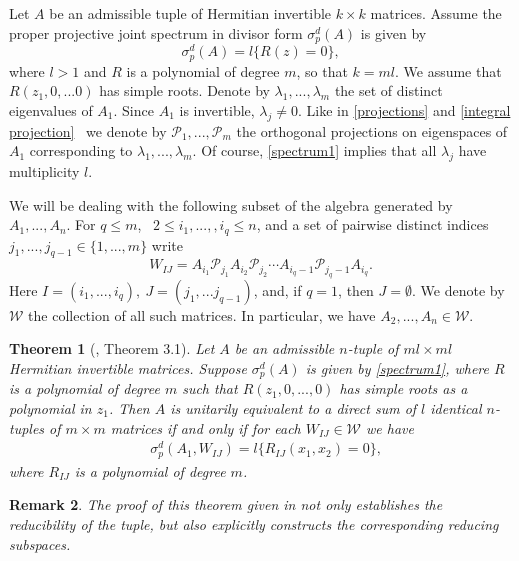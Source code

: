 \documentclass[draft, 12pt, reqno]{amsart}
\numberwithin{equation}{section}
\theoremstyle{plain}
\newtheorem{theorem}{Theorem}[section]
\newtheorem{remark}[theorem]{Remark}
\begin{document}
Let $A$ be an admissible tuple of Hermitian invertible $k\times k$ matrices.
Assume the proper projective joint spectrum in divisor form $\sigma_p^d(A)$ is given by
\begin{equation}\label{spectrum1}
\sigma_p^d(A)=l\Big\{ R(z)=0\Big\}, 
\end{equation}
where $l>1$ and $R$ is a polynomial of degree $m$, so that $k=ml$. We assume that $R(z_1,0,...0)$ has simple roots.
Denote by $\lambda_1,...,\lambda_m$ the set of distinct eigenvalues of $A_1$. Since $A_1$ is invertible, $\lambda_j\neq 0$. Like in \eqref{projections} and \eqref{integral projection}  \  we denote by $\mathcal{P}_1,...,\mathcal{P}_m$ the  orthogonal projections on eigenspaces of $A_1$ corresponding to $\lambda_1,...,\lambda_m$. Of course, \eqref{spectrum1} implies that all $\lambda_j$ have multiplicity $l$.

We will be dealing with the following subset of the algebra generated by $A_1,...,A_n$. 
For $q\leq m$, \  $2\leq i_1,...,,i_q\leq  n$, and a set of pairwise distinct indices $j_1,...,j_{q-1}\in \{1,...,m\}$  write 
\begin{equation}\label{W IJ}
W_{IJ} = A_{i_1}\mathcal{P}_{j_1}A_{i_2}\mathcal{P}_{j_2}\cdots A_{i_q-1}\mathcal{P}_{j_q-1}A_{i_q}.
\end{equation}
Here $I=(i_1,...,i_q), \ J=(j_1,...j_{q-1})$, and,  if $q=1$, then $J=\emptyset$. We denote by $\mathscr{W}$ the collection of all such matrices. In particular, we have $A_2,...,A_n  \in \mathscr{W}.$ 

\begin{theorem}[\cite{S2}, Theorem 3.1]\label{kipp  main}
Let $A$ be an admissible $n$-tuple of $ml\times ml$ Hermitian invertible matrices.  
Suppose $\sigma_p^d(A)$ is given by \eqref{spectrum1}, 
where $R$ is a  polynomial of degree $m$ such that $R(z_1,0,...,0)$ has simple roots as a polynomial in $z_1$. Then $A$ is unitarily equivalent to a direct sum of $l$ identical $n$-tuples of $m\times m$ matrices if and only if for each $W_{IJ}\in \mathscr{W}$ we have
\begin{eqnarray}
&\sigma_p^d(A_1,W_{IJ}) 
=l\{R_{IJ}(x_1,x_2)=0\}, \label{big spectrum}
\end{eqnarray}	
where $R_{IJ}$ is a polynomial of degree $m$.
\end{theorem}

\begin{remark} \label{explicit}\normalfont The proof of this theorem given in \cite{S2} not only establishes the reducibility of the tuple, but also explicitly constructs the corresponding reducing subspaces.
\end{remark}
\vspace{.2cm}
\end{document}
